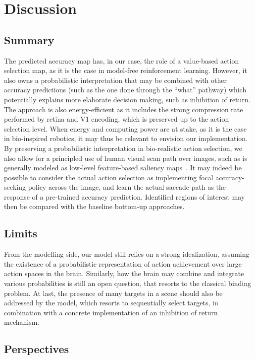\section{Discussion}
\label{sec:discussion}
\ICANN
{\color{blue}

\subsection{Summary}}
\fi
The predicted accuracy map has, in our case, the role of a value-based action selection map, as it is the case in model-free reinforcement learning. However, it also owns a probabilistic interpretation that may be combined with other accuracy predictions (such as the one done through the ``what'' pathway) which potentially explains more elaborate decision making, such as inhibition of return. The approach is also energy-efficient as it includes the strong compression rate performed by retina and V1 encoding, which is preserved up to the action selection level. When energy and computing power are at stake, as it is the case in bio-inspired robotics, it may thus be relevant to envision our implementation. By preserving a probabilistic interpretation in bio-realistic action selection, we also allow for a principled use of human visual scan path over images, such as is generally modeled as low-level feature-based saliency maps~\citep{Itti01}. It may indeed be possible to consider the actual action selection as implementing focal accuracy-seeking policy across the image, and learn the actual saccade path as the response of a pre-trained accuracy prediction. Identified regions of interest may then be compared with the baseline bottom-up approaches.

\ICANN
{\color{blue}\subsection{Limits}}
\fi


From the modelling side, our model still relies on a strong idealization, assuming the existence of a probabilistic representation of action achievement over large action spaces in the brain. Similarly, how the brain may combine and integrate various probabilities is still an open question, that resorts to the classical binding problem. %
At last, the presence of many targets in a scene should also be addressed by the model, which resorts to sequentially select targets, in combination with a concrete implementation of an inhibition of return mechanism.
\ICANN

{\color{blue}\subsection{Perspectives}}
\fi